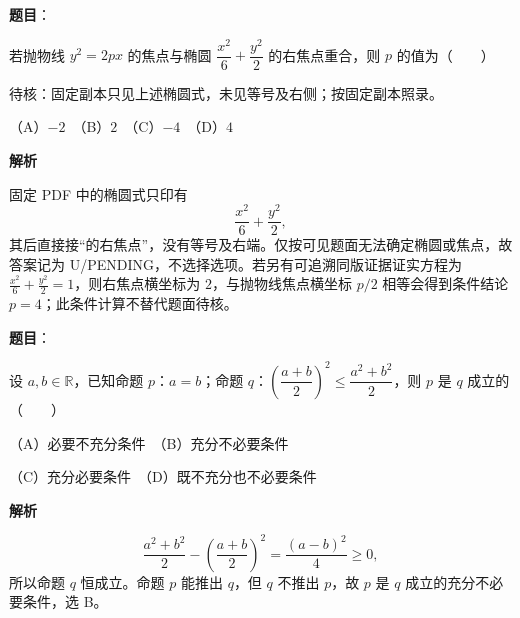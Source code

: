 \begin{answer}

\textbf{题目}：

若抛物线 $y^2=2px$ 的焦点与椭圆 $\dfrac{x^2}{6}+\dfrac{y^2}{2}$ 的右焦点重合，则 $p$ 的值为\mbox{（　　）}

\begin{gktip}
待核：固定副本只见上述椭圆式，未见等号及右侧；按固定副本照录。
\end{gktip}

（A）$-2$　（B）$2$　（C）$-4$　（D）$4$

\textbf{解析}

固定 PDF 中的椭圆式只印有
\nopagebreak[4]
\[
\frac{x^2}{6}+\frac{y^2}{2},
\]
其后直接接“的右焦点”，没有等号及右端。仅按可见题面无法确定椭圆或焦点，故答案记为 U/PENDING，不选择选项。若另有可追溯同版证据证实方程为 $\frac{x^2}{6}+\frac{y^2}{2}=1$，则右焦点横坐标为 $2$，与抛物线焦点横坐标 $p/2$ 相等会得到条件结论 $p=4$；此条件计算不替代题面待核。


\end{answer}
\begin{answer}

\textbf{题目}：

设 $a,b\in\mathbb R$，已知命题 $p\text{：}a=b$；命题 $q\text{：}\left(\dfrac{a+b}{2}\right)^2\leqslant\dfrac{a^2+b^2}{2}$，则 $p$ 是 $q$ 成立的\mbox{（　　）}

（A）必要不充分条件　（B）充分不必要条件

（C）充分必要条件　（D）既不充分也不必要条件

\textbf{解析}

\nopagebreak[4]
\[
\frac{a^2+b^2}{2}-\left(\frac{a+b}{2}\right)^2
=\frac{(a-b)^2}{4}\ge0,
\]
所以命题 $q$ 恒成立。命题 $p$ 能推出 $q$，但 $q$ 不推出 $p$，故 $p$ 是 $q$ 成立的充分不必要条件，选 B。


\end{answer}

